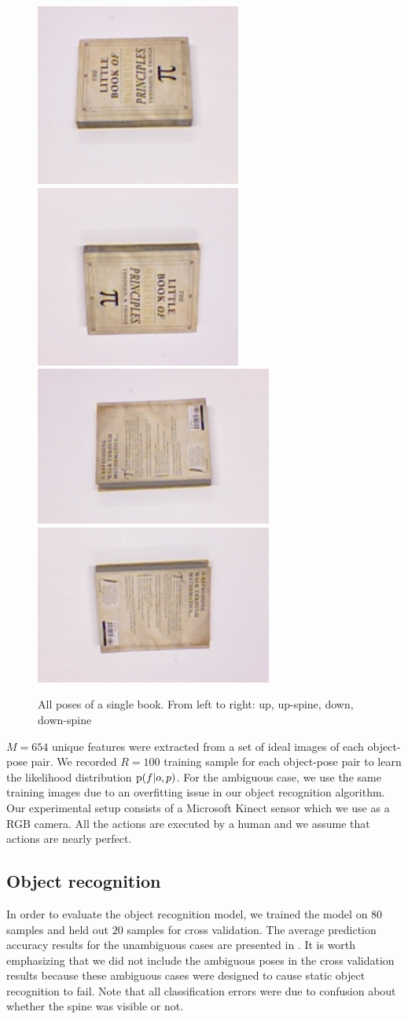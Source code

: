     \begin{figure}[h]
        \includegraphics[width = 0.2\columnwidth]{pics/math_cover1.jpg}
        \includegraphics[width = 0.2\columnwidth]{pics/math_cover1_rot.jpg}
        \includegraphics[width = 0.2\columnwidth]{pics/math_down.jpg}
        \includegraphics[width = 0.2\columnwidth]{pics/math_down_rot.jpg}
        \caption{All poses of a single book. From left to right: up, up-spine, down, down-spine} %
    \label{fig:pose_dataset}
    \end{figure}

    $M = 654$ unique features were extracted from a set of ideal images of each object-pose pair. We recorded $R = 100$ training sample for each object-pose pair to learn the likelihood distribution $\text{p}(f|o,p)$. For the ambiguous case, we use the same training images due to an overfitting issue in our object recognition algorithm. Our experimental setup consists of a Microsoft Kinect sensor which we use as a RGB camera. All the actions are executed by a human and we assume that actions are nearly perfect. 

    \subsection{Object recognition}
        In order to evaluate the object recognition model, we trained the model on $80$ samples and held out $20$ samples for cross validation. The average prediction accuracy results for the unambiguous cases are presented in . It is worth emphasizing that we did not include the ambiguous poses in the cross validation results because these ambiguous cases were designed to cause static object recognition to fail. Note that all classification errors were due to confusion about whether the spine was visible or not.
        
